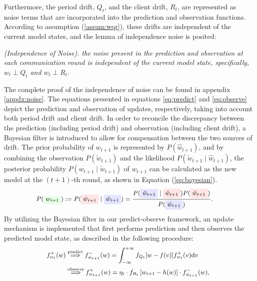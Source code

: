 Furthermore, the period drift, $Q_{t}$, and the client drift, $R_{t}$, are represented as noise terms that are incorporated into the prediction and observation functions. According to assumption (\ref{assum:wqr}), these drifts are independent of the current model states, and the lemma of independence noise is posited:
\begin{lemma}
   \label{lemma:independence_noise}
   \textit{(Independence of Noise). the noise present in the prediction and observation at each communication round is independent of the current model state, specifically, $w_t \perp Q_t$ and $w_t \perp R_t$.}
\end{lemma}
The complete proof of the independence of noise can be found in appendix \ref{appdx:noise}. 
The equations presented in equations \ref{eq:predict} and \ref{eq:observe} depict the prediction and observation of updates, respectively, taking into account both period drift and client drift. In order to reconcile the discrepancy between the prediction (including period drift) and observation (including client drift), a Bayesian filter is introduced to allow for compensation between the two sources of drift. The prior probability of $w_{t+1}$ is represented by $P(\hat{w}_{t+1})$, and by combining the observation $P(\tilde{w}_{t+1})$ and the likelihood $P(\tilde{w}_{t+1} \mid \hat{w}_{t+1})$, the posterior probability $P(w_{t+1} \mid\tilde{w}_{t+1})$ of $w_{t+1}$ can be calculated as the new model at the $(t+1)$-th round, as shown in Equation (\ref{eq:bayesian}).
\begin{equation}\label{eq:bayesian}
   \small
   \begin{aligned}
   P(\colorbox{green!10}{$w_{t+1}$})&:=P(\colorbox{red!10}{$\hat{w}_{t+1}$} \mid\colorbox{blue!10}{$\tilde{w}_{t+1} $})
   =\frac{P(\colorbox{blue!10}{$\tilde{w}_{t+1} $} \mid \colorbox{red!10}{$\hat{w}_{t+1}$}) P(\colorbox{red!10}{$\hat{w}_{t+1}$})}{P(\colorbox{blue!10}{$\tilde{w}_{t+1} $})}.
   \end{aligned}
\end{equation}
By utilizing the Bayesian filter in our predict-observe framework, an update mechanism is implemented that first performs prediction and then observes the predicted model state, as described in the following procedure:
\begin{equation}\label{eq:update}
   \small
   \begin{aligned}
   f_{w_t}^{+}(w) &\stackrel{\text {predict}}{\Longrightarrow} f_{\hat{w}_{t+1}}^{-}(w)=\int_{-\infty}^{+\infty} f_{Q_t}[w-f(v)] f_{w_t}^{+}(v) \mathrm{d} v\\ &\stackrel{\text {observe}}{\Longrightarrow} f_{w_{t+1}}^{+}(w)=\eta_t \cdot f_{R_t}\left[w_{t+1}-h(w)\right]
   \cdot f_{\hat{w}_{t+1}}^{-}(w),
   \end{aligned}
   \end{equation}
